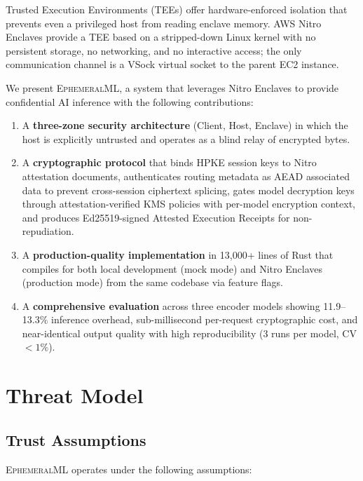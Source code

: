 \documentclass[11pt,a4paper]{article}
\newcommand{\BenchNumRuns}{3}
\newcommand{\BenchOverheadRange}{11.9--13.3\%}
\begin{document}
Trusted Execution Environments (TEEs) offer hardware-enforced isolation that prevents even a privileged host from reading enclave memory.
AWS Nitro Enclaves provide a TEE based on a stripped-down Linux kernel with no persistent storage, no networking, and no interactive access; the only communication channel is a VSock virtual socket to the parent EC2 instance.

We present \textsc{EphemeralML}, a system that leverages Nitro Enclaves to provide confidential AI inference with the following contributions:

\begin{enumerate}
  \item A \textbf{three-zone security architecture} (Client, Host, Enclave) in which the host is explicitly untrusted and operates as a blind relay of encrypted bytes.
  \item A \textbf{cryptographic protocol} that binds HPKE session keys to Nitro attestation documents, authenticates routing metadata as AEAD associated data to prevent cross-session ciphertext splicing, gates model decryption keys through attestation-verified KMS policies with per-model encryption context, and produces Ed25519-signed Attested Execution Receipts for non-repudiation.
  \item A \textbf{production-quality implementation} in 13,000+ lines of Rust that compiles for both local development (mock mode) and Nitro Enclaves (production mode) from the same codebase via feature flags.
  \item A \textbf{comprehensive evaluation} across three encoder models showing \BenchOverheadRange{} inference overhead, sub-millisecond per-request cryptographic cost, and near-identical output quality with high reproducibility (\BenchNumRuns{} runs per model, CV $< 1\%$).
\end{enumerate}

\section{Threat Model}
\label{sec:threat-model}

\subsection{Trust Assumptions}

\textsc{EphemeralML} operates under the following assumptions:
\end{document}
